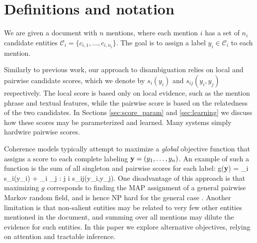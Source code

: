 \section{Definitions and notation}
\label{sec:notation}

We are given a document with $n$ mentions, where each mention $i$ has a set of $n_i$ candidate entities $\mathcal{C}_i = \{c_{i,1}, ..., c_{i,n_i}\}$. The goal is to assign a label $y_i \in \mathcal{C}_i$ to each mention.

Similarly to previous work, our approach to disambiguation relies on local and pairwise candidate scores, which we denote by $s_i(y_i)$ and $s_{ij}(y_i, y_j)$ respectively. The local score is based only on local evidence, such as the mention phrase and textual features, while the pairwise score is based on the relatedness of the two candidates. 
In Sections \ref{sec:score_param} and \ref{sec:learning} we discuss how these scores may be parameterized and learned.  Many systems \cite{Cucerzan07,Milne2008,KulkarniSRC09} simply hardwire pairwise scores.


Coherence models typically attempt to maximize a {\em global} objective function that assigns a score to each complete labeling ${\bf y} = (y_1,\ldots, y_n)$. 
An example of such a function is the sum of all singleton and pairwise scores for each label:
\be
g({\bf y}) = \sum_i s_i(y_i) + \sum_i \sum_{j :  j \neq i} s_{ij}(y_i,y_j).
\label{eq:global_obj}
\ee 
One disadvantage of this approach is that maximizing $g$ corresponds to finding the MAP assignment of a general pairwise Markov random field, and is hence
NP hard for the general case \cite{wainwright2008graphical}. Another limitation is that non-salient entities may be related to very few other entities mentioned in the document, and summing over all mentions may dilute the evidence for such entities. In this paper we explore alternative objectives, relying on attention and tractable inference.



